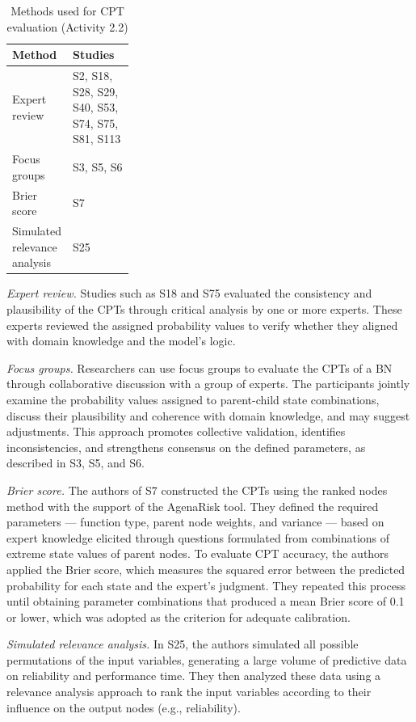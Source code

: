 \begin{table}[t]
\caption{Methods used for CPT evaluation (Activity 2.2)}
\label{tab:metodos_cpt_avaliacao}
\centering
\small
\setlength{\tabcolsep}{6pt}
\renewcommand{\arraystretch}{1.2}

\begin{tabularx}{0.70\linewidth}{>{\raggedright\arraybackslash}p{0.30\linewidth}
                              >{\raggedright\arraybackslash}X}
\toprule
\textbf{Method} & \textbf{Studies} \\
\midrule
Expert review
& S2, S18, S28, S29, S40, S53, S74, S75, S81, S113 \\
Focus groups
& S3, S5, S6 \\
Brier score
& S7 \\
Simulated relevance analysis
& S25 \\
\bottomrule
\end{tabularx}
\end{table}

\textit{Expert review.} Studies such as S18 and S75 evaluated the consistency and plausibility of the CPTs through critical analysis by one or more experts. These experts reviewed the assigned probability values to verify whether they aligned with domain knowledge and the model's logic.

\textit{Focus groups.} Researchers can use focus groups to evaluate the CPTs of a BN through collaborative discussion with a group of experts. The participants jointly examine the probability values assigned to parent-child state combinations, discuss their plausibility and coherence with domain knowledge, and may suggest adjustments. This approach promotes collective validation, identifies inconsistencies, and strengthens consensus on the defined parameters, as described in S3, S5, and S6.

\textit{Brier score.} The authors of S7 constructed the CPTs using the ranked nodes method with the support of the AgenaRisk tool. They defined the required parameters --- function type, parent node weights, and variance --- based on expert knowledge elicited through questions formulated from combinations of extreme state values of parent nodes. To evaluate CPT accuracy, the authors applied the Brier score, which measures the squared error between the predicted probability for each state and the expert's judgment. They repeated this process until obtaining parameter combinations that produced a mean Brier score of 0.1 or lower, which was adopted as the criterion for adequate calibration.

\textit{Simulated relevance analysis.} In S25, the authors simulated all possible permutations of the input variables, generating a large volume of predictive data on reliability and performance time. They then analyzed these data using a relevance analysis approach to rank the input variables according to their influence on the output nodes (e.g., reliability).


